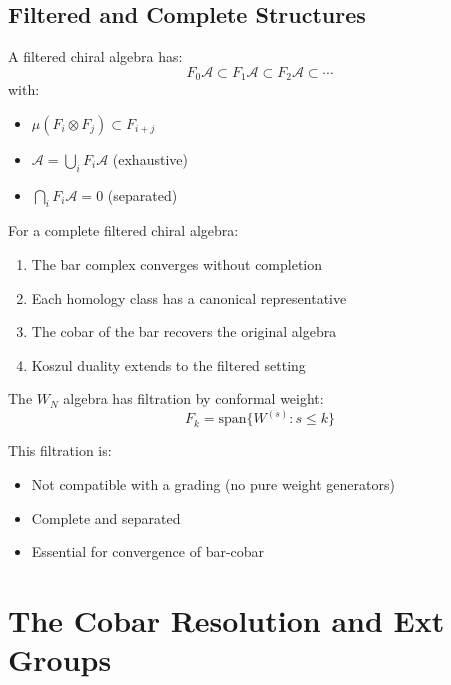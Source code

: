 \subsection{Filtered and Complete Structures}

\begin{definition}
A filtered chiral algebra has:
$$F_0\mathcal{A} \subset F_1\mathcal{A} \subset F_2\mathcal{A} \subset \cdots$$
with:
\begin{itemize}
\item $\mu(F_i \otimes F_j) \subset F_{i+j}$
\item $\mathcal{A} = \bigcup_i F_i\mathcal{A}$ (exhaustive)
\item $\bigcap_i F_i\mathcal{A} = 0$ (separated)
\end{itemize}
\end{definition}

\begin{theorem}
For a complete filtered chiral algebra:
\begin{enumerate}
\item The bar complex converges without completion
\item Each homology class has a canonical representative
\item The cobar of the bar recovers the original algebra
\item Koszul duality extends to the filtered setting
\end{enumerate}
\end{theorem}

\begin{example}
The $W_N$ algebra has filtration by conformal weight:
$$F_k = \text{span}\{W^{(s)} : s \leq k\}$$

This filtration is:
\begin{itemize}
\item Not compatible with a grading (no pure weight generators)
\item Complete and separated
\item Essential for convergence of bar-cobar
\end{itemize}
\end{example}


\section{The Cobar Resolution and Ext Groups}

